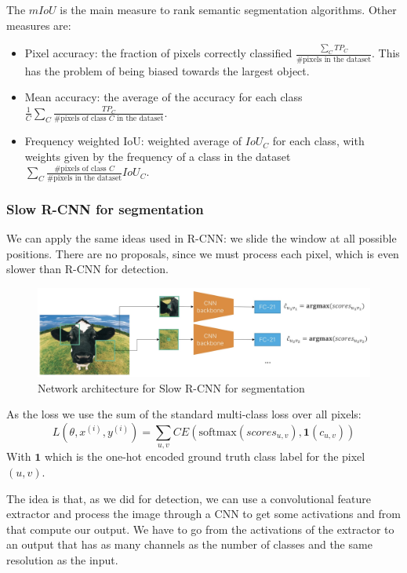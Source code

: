 The $mIoU$ is the main measure to rank semantic segmentation algorithms.
Other measures are:
\begin{itemize}
  \item Pixel accuracy: the fraction of pixels correctly classified $\frac{\sum_{C} TP_C}{\text{\# pixels in the dataset}}$. This has the problem of being biased towards the largest object.
  \item Mean accuracy: the average of the accuracy for each class $\frac{1}{C} \sum_{C} \frac{TP_C}{\text{\# pixels of class }C \text{ in the dataset}}$.
  \item Frequency weighted IoU: weighted average of $IoU_C$ for each class, with weights given by the frequency of a class in the dataset $\sum_{C} \frac{\text{\# pixels of class }C}{\text{\# pixels in the dataset}} IoU_C$.
\end{itemize}

\subsubsection{Slow R-CNN for segmentation}
We can apply the same ideas used in R-CNN: we slide the window at all possible positions.
There are no proposals, since we must process each pixel, which is even slower than R-CNN for detection.

\begin{figure}[htbp]
  \centering
  \includegraphics[width=0.7\linewidth]{./img/slow_rcnn_segmentation.jpg}
  \caption{Network architecture for Slow R-CNN for segmentation}
\end{figure}

As the loss we use the sum of the standard multi-class loss over all pixels:
$$L(\theta, x^{(i)}, y^{(i)}) = \sum_{u,v} CE\left(\text{softmax}(scores_{u,v}), \mathbf{1}(c_{u,v})\right)$$
With $\mathbf{1}$ which is the one-hot encoded ground truth class label for the pixel $(u,v)$.

The idea is that, as we did for detection, we can use a convolutional feature extractor and process the image through a CNN to get some activations and from that compute our output.
We have to go from the activations of the extractor to an output that has as many channels as the number of classes and the same resolution as the input.

